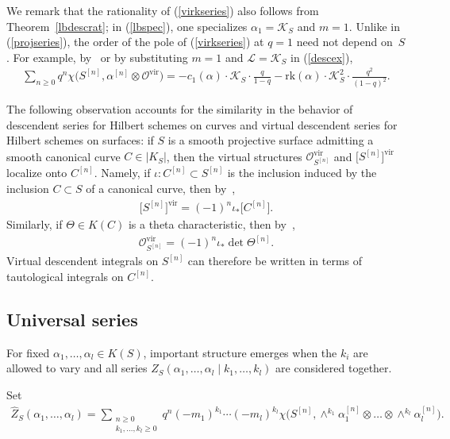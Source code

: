 \documentclass[10pt,a4paper]{amsart}
\numberwithin{equation}{section}
\def\O{\mathcal{O}}
\newcommand{\vir}{\mathrm{vir}}
\begin{document}
We remark that the rationality of (\ref{virkseries}) also follows from Theorem~\ref{lbdescrat}; in (\ref{lbspec}), one specializes $\alpha_1=\mathcal{K}_S$ and $m=1$. Unlike in (\ref{projseries}), the order of the pole of (\ref{virkseries}) at $q=1$ need not depend on~$S$. For example, by~\cite[Example 7]{AJLOP} or by substituting $m=1$ and $\mathcal{L}=\mathcal{K}_S$ in (\ref{descex}),
\begin{gather*}
\sum_{n\geq 0} q^n \chi\big(S^{[n]},\alpha^{[n]}\otimes \mathcal{O}^{\vir}\big)=-c_1(\alpha) \cdot \mathcal{K}_S\cdot \frac{q}{1-q}-\mathrm{rk}(\alpha)\cdot \mathcal{K}_S^2\cdot \frac{q^2}{(1-q)^2}.
\end{gather*}

The following observation accounts for the similarity in the behavior of descendent series for Hilbert schemes on curves and virtual descendent series for Hilbert schemes on surfaces: if $S$ is a smooth projective surface admitting a smooth canonical curve $C\in |K_S|$, then the virtual structures $\O^{\vir}_{S^{[n]}}$ and $\big[S^{[n]}\big]^{\vir}$ localize onto $C^{[n]}$.
Namely, if $\iota\colon C^{[n]}\subset S^{[n]}$ is the inclusion induced by the inclusion $C\subset S$ of a canonical curve, then by~\cite[equation~(33)]{OP},
\begin{gather*}
\big[S^{[n]}\big]^{\vir}=(-1)^{n}\iota_{*} \big[C^{[n]}\big].
\end{gather*}
Similarly, if $\Theta\in K(C)$ is a theta characteristic, then by~\cite[Theorem~15]{AJLOP},
\begin{gather*}
\O^{\vir}_{S^{[n]}}=(-1)^{n} \iota_{*} \det\Theta^{[n]}.
\end{gather*}
Virtual descendent integrals on $S^{[n]}$ can therefore be written in terms of tautological integrals on $C^{[n]}$.



\subsection{Universal series}\label{secuniv}
For fixed $\alpha_1,\dots, \alpha_l\in K(S)$, important structure emerges when the $k_i$ are allowed to vary and all series $Z_S(\alpha_1,\dots ,\alpha_l\mid k_1,\dots,k_l)$ are considered together.

Set
\begin{align}\label{exseries}
\hat{Z}_S( \alpha_1,\dots,\alpha_l)= \sum_{\substack{n\geq 0 \\ k_1,\dots,k_l\geq 0}} q^{n}(-m_1)^{k_1}\cdots (-m_l)^{k_l} \chi\big(S^{[n]}, \wedge^{k_1} \alpha^{[n]}_1 \otimes \dots \otimes \wedge^{k_l} \alpha_l^{[n]} \big).
\end{align}
\end{document}
